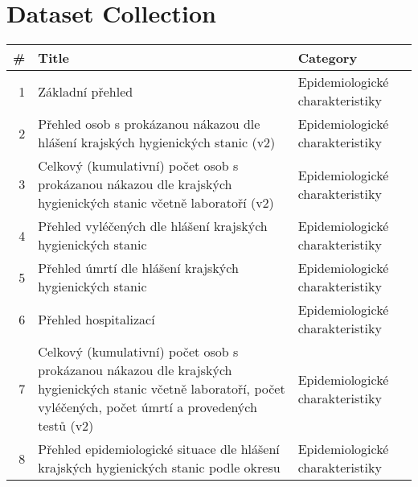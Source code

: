 \chapter{Dataset Collection}\label{ch:dataset-collection}

\begin{table}[htbp]
    \centering

    \begin{longtable}{@{}rp{10cm}l@{}}
        \toprule
        \# & Title                                                                                                                                                               & Category                          \\ \midrule
         1 & Základní přehled                                                                                                                                                    & Epidemiologické charakteristiky   \\
         2 & Přehled osob s prokázanou nákazou dle hlášení krajských hygienických stanic (v2)                                                                                    & Epidemiologické charakteristiky   \\
         3 & Celkový (kumulativní) počet osob s prokázanou nákazou dle krajských hygienických stanic včetně laboratoří (v2)                                                      & Epidemiologické charakteristiky   \\
         4 & Přehled vyléčených dle hlášení krajských hygienických stanic                                                                                                        & Epidemiologické charakteristiky   \\
         5 & Přehled úmrtí dle hlášení krajských hygienických stanic                                                                                                             & Epidemiologické charakteristiky   \\
         6 & Přehled hospitalizací                                                                                                                                               & Epidemiologické charakteristiky   \\
         7 & Celkový (kumulativní) počet osob s prokázanou nákazou dle krajských hygienických stanic včetně laboratoří, počet vyléčených, počet úmrtí a provedených testů (v2)   & Epidemiologické charakteristiky   \\
         8 & Přehled epidemiologické situace dle hlášení krajských hygienických stanic podle okresu                                                                              & Epidemiologické charakteristiky   \\

\end{longtable}
\end{table}
